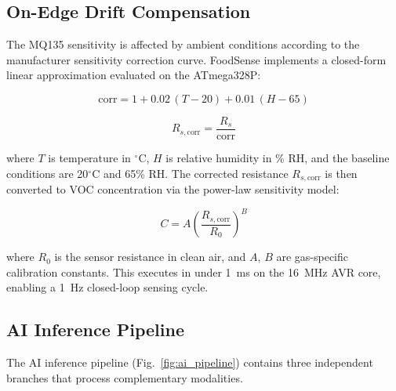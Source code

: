 \documentclass[conference]{IEEEtran}
\begin{document}
\subsection{On-Edge Drift Compensation}

The MQ135 sensitivity is affected by ambient conditions according to
the manufacturer sensitivity correction curve. FoodSense implements a
closed-form linear approximation evaluated on the ATmega328P:

\begin{equation}
  \text{corr} = 1 + 0.02\,(T - 20) + 0.01\,(H - 65)
  \label{eq:corr}
\end{equation}

\begin{equation}
  R_{s,\text{corr}} = \frac{R_s}{\text{corr}}
  \label{eq:rs_corr}
\end{equation}

\noindent
where $T$ is temperature in $^{\circ}$C, $H$ is relative humidity in
\% RH, and the baseline conditions are 20$^{\circ}$C and 65\% RH.
The corrected resistance $R_{s,\text{corr}}$ is then converted to
VOC concentration via the power-law sensitivity model:

\begin{equation}
  C = A \left(\frac{R_{s,\text{corr}}}{R_0}\right)^{B}
  \label{eq:conc}
\end{equation}

\noindent
where $R_0$ is the sensor resistance in clean air, and $A$, $B$ are
gas-specific calibration constants. This executes in under 1~ms on the
16~MHz AVR core, enabling a 1~Hz closed-loop sensing cycle.

\subsection{AI Inference Pipeline}

The AI inference pipeline (Fig.~\ref{fig:ai_pipeline}) contains three
independent branches that process complementary modalities.
\end{document}

